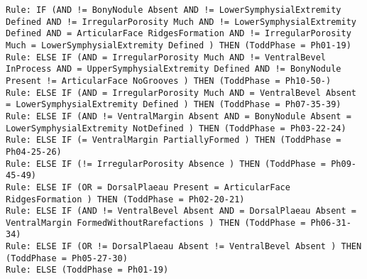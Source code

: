 \begin{lstlisting}
Rule: IF (AND != BonyNodule Absent AND != LowerSymphysialExtremity Defined AND != IrregularPorosity Much AND != LowerSymphysialExtremity Defined AND = ArticularFace RidgesFormation AND != IrregularPorosity Much = LowerSymphysialExtremity Defined ) THEN (ToddPhase = Ph01-19)
Rule: ELSE IF (AND = IrregularPorosity Much AND != VentralBevel InProcess AND = UpperSymphysialExtremity Defined AND != BonyNodule Present != ArticularFace NoGrooves ) THEN (ToddPhase = Ph10-50-)
Rule: ELSE IF (AND = IrregularPorosity Much AND = VentralBevel Absent = LowerSymphysialExtremity Defined ) THEN (ToddPhase = Ph07-35-39)
Rule: ELSE IF (AND != VentralMargin Absent AND = BonyNodule Absent = LowerSymphysialExtremity NotDefined ) THEN (ToddPhase = Ph03-22-24)
Rule: ELSE IF (= VentralMargin PartiallyFormed ) THEN (ToddPhase = Ph04-25-26)
Rule: ELSE IF (!= IrregularPorosity Absence ) THEN (ToddPhase = Ph09-45-49)
Rule: ELSE IF (OR = DorsalPlaeau Present = ArticularFace RidgesFormation ) THEN (ToddPhase = Ph02-20-21)
Rule: ELSE IF (AND != VentralBevel Absent AND = DorsalPlaeau Absent = VentralMargin FormedWithoutRarefactions ) THEN (ToddPhase = Ph06-31-34)
Rule: ELSE IF (OR != DorsalPlaeau Absent != VentralBevel Absent ) THEN (ToddPhase = Ph05-27-30)
Rule: ELSE (ToddPhase = Ph01-19)
\end{lstlisting}

\newpage
